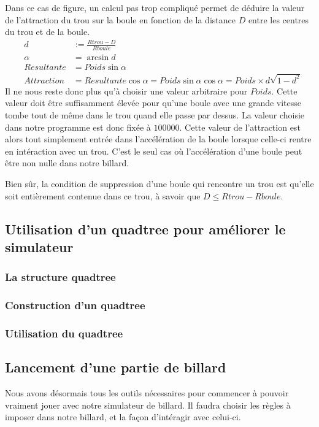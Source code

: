 \documentclass[a4paper,11pt]{article}
\begin{document}
Dans ce cas de figure, un calcul pas trop compliqué permet de déduire la valeur de l'attraction du trou
sur la boule en fonction de la distance $D$ entre les centres du trou et de la boule.
\begin{eqnarray}
&d& := \frac{Rtrou - D}{Rboule} \nonumber \\
&\alpha& = \arcsin d \nonumber \\
&Resultante& = Poids \sin \alpha \nonumber \\
&Attraction& = Resultante \cos \alpha = Poids \sin \alpha \cos \alpha = Poids \times d \sqrt{1 - d^2} \nonumber
\end{eqnarray}
Il ne nous reste donc plus qu'à choisir une valeur arbitraire pour $Poids$. Cette valeur doit être
suffisamment élevée pour qu'une boule avec une grande vitesse tombe tout de même dans le trou quand elle
passe par dessus. La valeur choisie dans notre programme est donc fixée à $100000$. Cette valeur de l'attraction
est alors tout simplement entrée dans l'accélération de la boule lorsque celle-ci rentre en intéraction avec un
trou. C'est le seul cas où l'accélération d'une boule peut être non nulle dans notre billard.

Bien sûr, la condition de suppression d'une boule qui rencontre un trou est qu'elle soit entièrement contenue
dans ce trou, à savoir que $ D \leqslant Rtrou - Rboule $.

\subsection{Utilisation d'un quadtree pour améliorer le simulateur}

\subsubsection{La structure quadtree}

\subsubsection{Construction d'un quadtree}

\subsubsection{Utilisation du quadtree}

\subsection{Lancement d'une partie de billard}
Nous avons désormais tous les outils nécessaires pour commencer à pouvoir vraiment jouer avec notre simulateur
de billard. Il faudra choisir les règles à imposer dans notre billard, et la façon d'intéragir avec celui-ci.
\end{document}
